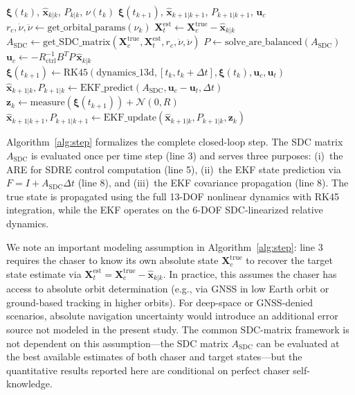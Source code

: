 \documentclass[preprint,3p,times]{elsarticle}
\begin{document}
\begin{algorithm}[h]
\caption{Unified EKF-SDRE Closed-Loop Step}
\label{alg:step}
\begin{algorithmic}[1]
\REQUIRE $\boldsymbol{\xi}(t_k)$, $\hat{\mathbf{x}}_{k|k}$, $P_{k|k}$, $\nu(t_k)$
\ENSURE $\boldsymbol{\xi}(t_{k+1})$, $\hat{\mathbf{x}}_{k+1|k+1}$, $P_{k+1|k+1}$, $\mathbf{u}_c$
\STATE $r_c, \dot{\nu}, \ddot{\nu} \gets \text{get\_orbital\_params}(\nu_k)$
\STATE $\mathbf{X}_t^{\text{est}} \gets \mathbf{X}_c^{\text{true}} - \hat{\mathbf{x}}_{k|k}$ \quad{}
\STATE $A_{\text{SDC}} \gets \text{get\_SDC\_matrix}(\mathbf{X}_c^{\text{true}}, \mathbf{X}_t^{\text{est}}, r_c, \dot{\nu}, \ddot{\nu})$ \quad{}
    \STATE $P \gets \text{solve\_are\_balanced}(A_{\text{SDC}})$
\ENDIF
\STATE $\mathbf{u}_c \gets -R_{\text{ctrl}}^{-1} B^T P \,\hat{\mathbf{x}}_{k|k}$ \quad{}
\STATE $\boldsymbol{\xi}(t_{k+1}) \gets \text{RK45}(\text{dynamics\_13d}, [t_k, t_k+\Delta t], \boldsymbol{\xi}(t_k), \mathbf{u}_c, \mathbf{u}_t)$
\STATE $\hat{\mathbf{x}}_{k+1|k}, P_{k+1|k} \gets \text{EKF\_predict}(A_{\text{SDC}}, \mathbf{u}_c - \mathbf{u}_t, \Delta t)$ \quad{}
\STATE $\mathbf{z}_k \gets \text{measure}(\boldsymbol{\xi}(t_{k+1})) + \mathcal{N}(0, R)$
\STATE $\hat{\mathbf{x}}_{k+1|k+1}, P_{k+1|k+1} \gets \text{EKF\_update}(\hat{\mathbf{x}}_{k+1|k}, P_{k+1|k}, \mathbf{z}_k)$
\end{algorithmic}
\end{algorithm}

Algorithm~\ref{alg:step} formalizes the complete closed-loop step. The SDC matrix $A_{\text{SDC}}$ is evaluated once per time step (line 3) and serves three purposes: (i)~the ARE for SDRE control computation (line 5), (ii)~the EKF state prediction via $F = I + A_{\text{SDC}}\Delta t$ (line 8), and (iii)~the EKF covariance propagation (line 8). The true state is propagated using the full 13-DOF nonlinear dynamics with RK45 integration, while the EKF operates on the 6-DOF SDC-linearized relative dynamics.

We note an important modeling assumption in Algorithm~\ref{alg:step}: line 3 requires the chaser to know its own absolute state $\mathbf{X}_c^{\text{true}}$ to recover the target state estimate via $\mathbf{X}_t^{\text{est}} = \mathbf{X}_c^{\text{true}} - \hat{\mathbf{x}}_{k|k}$. In practice, this assumes the chaser has access to absolute orbit determination (e.g., via GNSS in low Earth orbit or ground-based tracking in higher orbits). For deep-space or GNSS-denied scenarios, absolute navigation uncertainty would introduce an additional error source not modeled in the present study. The common SDC-matrix framework is not dependent on this assumption---the SDC matrix $A_{\text{SDC}}$ can be evaluated at the best available estimates of both chaser and target states---but the quantitative results reported here are conditional on perfect chaser self-knowledge.
\end{document}
